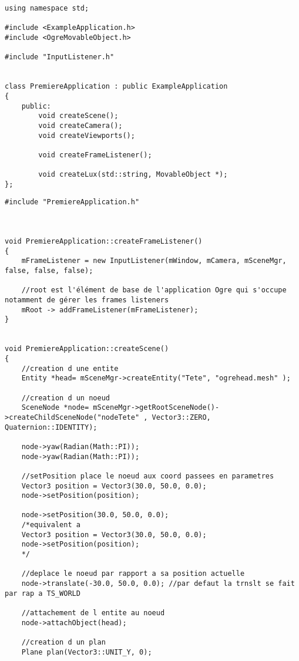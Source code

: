 \begin{lstlisting}[caption={PremiereApplication.h}]
using namespace std;

#include <ExampleApplication.h>
#include <OgreMovableObject.h>

#include "InputListener.h"


class PremiereApplication : public ExampleApplication
{
    public:
        void createScene();
        void createCamera();
        void createViewports();

        void createFrameListener();
        
        void createLux(std::string, MovableObject *);
};
\end{lstlisting}


\begin{lstlisting}[caption={PremiereApplication.cpp}]
#include "PremiereApplication.h"



void PremiereApplication::createFrameListener()
{
    mFrameListener = new InputListener(mWindow, mCamera, mSceneMgr, false, false, false);
    
    //root est l'élément de base de l'application Ogre qui s'occupe notamment de gérer les frames listeners
    mRoot -> addFrameListener(mFrameListener);
}


void PremiereApplication::createScene()
{
    //creation d une entite
    Entity *head= mSceneMgr->createEntity("Tete", "ogrehead.mesh" );
    
    //creation d un noeud
    SceneNode *node= mSceneMgr->getRootSceneNode()->createChildSceneNode("nodeTete" , Vector3::ZERO, Quaternion::IDENTITY);
    
    node->yaw(Radian(Math::PI));
    node->yaw(Radian(Math::PI));

    //setPosition place le noeud aux coord passees en parametres
    Vector3 position = Vector3(30.0, 50.0, 0.0);
    node->setPosition(position);

    node->setPosition(30.0, 50.0, 0.0); 
    /*equivalent a
    Vector3 position = Vector3(30.0, 50.0, 0.0);
    node->setPosition(position);
    */

    //deplace le noeud par rapport a sa position actuelle
    node->translate(-30.0, 50.0, 0.0); //par defaut la trnslt se fait par rap a TS_WORLD
   
    //attachement de l entite au noeud
    node->attachObject(head);

    //creation d un plan
    Plane plan(Vector3::UNIT_Y, 0);


\end{lstlisting}
